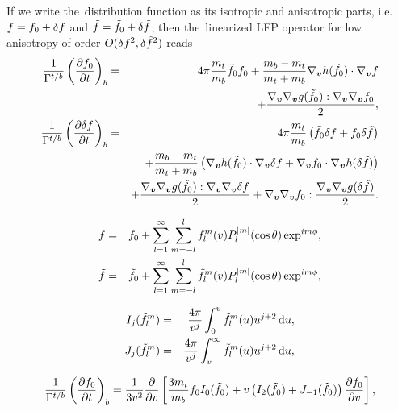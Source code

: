 If we write the~distribution function as its isotropic and anisotropic parts, 
i.e. $f = f_0 + \delta f$ and $\tilde{f} = \tilde{f}_0 + \delta\tilde{f}$, 
then the~linearized LFP operator for low anisotropy of order 
$O(\delta f^2, \delta\tilde{f}^2)$ reads 
\begin{eqnarray}
  \frac{1}{\Gamma^{t/b}} \left(\frac{\partial{f_0}}{\partial{t}}\right)_{b} &=&  
  4\pi \frac{m_{t}}{m_b} \tilde{f}_0 f_0 
  + \frac{m_b - m_t}{m_t + m_b} \nabla_{\boldsymbol{v}}h(\tilde{f}_0)\cdot\nabla_{\boldsymbol{v}} f \nonumber \\ 
  &&+ \frac{\nabla_{\boldsymbol{v}}\nabla_{\boldsymbol{v}}g(\tilde{f}_0) : \nabla_{\boldsymbol{v}}\nabla_{\boldsymbol{v}} f_0}{2} ,
  \label{eq:FP_f0} \\ 
  \frac{1}{\Gamma^{t/b}}\left(\frac{\partial{\delta f}}{\partial{t}}\right)_{b} &=&  
  4\pi \frac{m_{t}}{m_b} 
  \left(\tilde{f}_0\delta f + f_0\delta\tilde{f}\right) \nonumber \\ 
  &&+ \frac{m_b - m_t}{m_t + m_b} 
  \left(\nabla_{\boldsymbol{v}}h(\tilde{f}_0)\cdot\nabla_{\boldsymbol{v}} \delta f + \nabla_{\boldsymbol{v}}f_0\cdot\nabla_{\boldsymbol{v}}h(\delta\tilde{f})\right)
  \nonumber \\ 
  &&+ \frac{\nabla_{\boldsymbol{v}}\nabla_{\boldsymbol{v}}g(\tilde{f}_0) : \nabla_{\boldsymbol{v}}\nabla_{\boldsymbol{v}} \delta f}{2} 
  + \nabla_{\boldsymbol{v}}\nabla_{\boldsymbol{v}} f_0 : \frac{\nabla_{\boldsymbol{v}}\nabla_{\boldsymbol{v}}g(\delta\tilde{f})}{2} .
  \label{eq:FP_deltaf} 
\end{eqnarray}

\begin{eqnarray}
  f &=& f_0 + \sum_{l=1}^\infty\sum_{m=-l}^l f^m_l(v) 
  P_l^{|m|}(\cos \theta) \exp^{i m \phi} ,
  \nonumber \\ 
  \tilde{f} &=& \tilde{f}_0 + \sum_{l=1}^\infty\sum_{m=-l}^l \tilde{f}^m_l(v) 
  P_l^{|m|}(\cos \theta) \exp^{i m \phi} ,
  \nonumber
\end{eqnarray}

\begin{eqnarray}
  I_j(\tilde{f}_l^m) &=& \frac{4\pi}{v^j} \int_0^v \tilde{f}_l^m(u) u^{j+2}
  \, \text{d} u ,
  \nonumber \\
  J_j(\tilde{f}_l^m) &=& \frac{4\pi}{v^j} \int_v^\infty 
  \tilde{f}_l^m(u) u^{j+2}\, \text{d} u ,
  \nonumber
\end{eqnarray}

\begin{equation}
  \frac{1}{\Gamma^{t/b}}\left(\frac{\partial{f_0}}{\partial{t}}\right)_{b} =
  \frac{1}{3v^2}\frac{\partial{}}{\partial{v}}\left[\frac{3 m_t}{m_b} 
  f_0 I_0(\tilde{f}_0) + v \left( I_2(\tilde{f}_0) + J_{-1}(\tilde{f}_0)\right)
  \frac{\partial{f_0}}{\partial{v}} \right] ,
  \nonumber
\end{equation}


